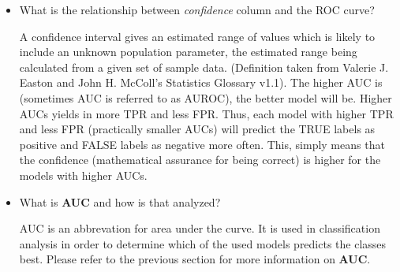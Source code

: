 \documentclass[12pt]{article}
\numberwithin{equation}{section}
\numberwithin{table}{section}
\numberwithin{figure}{section}
\begin{document}
\begin{itemize}
	\item What is the relationship between \textit{confidence} column and the ROC curve?
	
	A confidence interval gives an estimated range of values which is likely to include an unknown population parameter, the estimated range being calculated from a given set of sample data. (Definition taken from Valerie J. Easton and John H. McColl's Statistics Glossary v1.1). The higher AUC is (sometimes AUC is referred to as AUROC), the better model will be. Higher AUCs yields in more TPR and less FPR. Thus, each model with higher TPR and less FPR (practically smaller AUCs) will predict the TRUE labels as positive and FALSE labels as negative more often. This, simply means that the confidence (mathematical assurance for being correct) is higher for the models with higher AUCs.
	\item What is \textbf{AUC} and how is that analyzed?
	
	AUC is an abbrevation for area under the curve. It is used in classification analysis in order to determine which of the used models predicts the classes best. Please refer to the previous section for more information on \textbf{AUC}.
\end{itemize}
\end{document}
